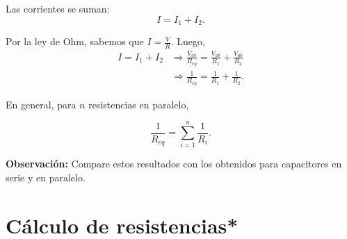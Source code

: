 \begin{itemize}
Las corrientes se suman:
$$I = I_1 + I_2.$$

Por la ley de Ohm, sabemos que $I = \frac{V}{R}$. Luego,
\begin{align*}
   I = I_1 + I_2 
&\Rightarrow  \frac{V_{ab}}{R_{eq}} = \frac{V_{ab}}{R_1} + \frac{V_{ab}}{R_2} \\
&\Rightarrow \frac{1}{R_{eq}} = \frac{1}{R_1} + \frac{1}{R_2}. 
\end{align*}

En general, para $n$ resistencias en paralelo,
\begin{shaded}
    $$\frac{1}{R_{eq}} = \sum_{i=1}^n \frac{1}{R_i}.$$
\end{shaded}
\end{itemize}

\textbf{Observación:} Compare estos resultados con los obtenidos para capacitores en serie y en paralelo.

\section{Cálculo de resistencias*}

